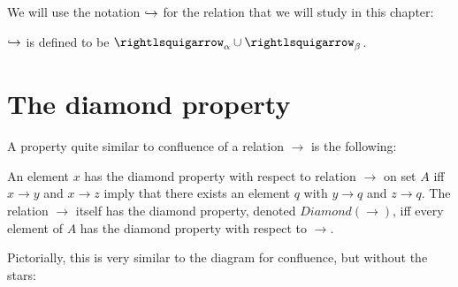 We will use the notation $\hookrightarrow$ for the relation that we
will study in this chapter:

\begin{definition}
  \label{def:abeta}
  $\hookrightarrow$ is defined to be $\curva_\alpha \cup \curva_\beta$.
  \end{definition}

\section{The diamond property}

A property quite similar to confluence of a relation $\to$ is
the following:
\begin{definition}
  An element $x$ has the diamond property with respect to relation
  $\to$ on set $A$ iff $x \to y$ and $x \to z$ imply that there exists an element $q$
  with $y \to q$ and $z \to q$. The relation $\to$ itself has the diamond
  property, denoted $\textit{Diamond}(\to)$, iff every element of $A$ has
  the diamond property with respect to $\to$.  
  \end{definition}
\noindent Pictorially, this is very similar to the diagram for confluence,
but without the stars:

\begin{center}
\end{center}

